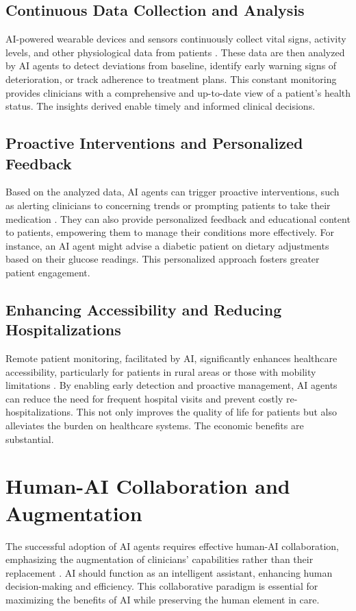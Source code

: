 \documentclass[12pt,a4paper]{article}
\begin{document}
\subsection{Continuous Data Collection and Analysis}
AI-powered wearable devices and sensors continuously collect vital signs, activity levels, and other physiological data from patients \cite{oracle}. These data are then analyzed by AI agents to detect deviations from baseline, identify early warning signs of deterioration, or track adherence to treatment plans. This constant monitoring provides clinicians with a comprehensive and up-to-date view of a patient's health status. The insights derived enable timely and informed clinical decisions.

\subsection{Proactive Interventions and Personalized Feedback}
Based on the analyzed data, AI agents can trigger proactive interventions, such as alerting clinicians to concerning trends or prompting patients to take their medication \cite{nih_patient_outcomes}. They can also provide personalized feedback and educational content to patients, empowering them to manage their conditions more effectively. For instance, an AI agent might advise a diabetic patient on dietary adjustments based on their glucose readings. This personalized approach fosters greater patient engagement.

\subsection{Enhancing Accessibility and Reducing Hospitalizations}
Remote patient monitoring, facilitated by AI, significantly enhances healthcare accessibility, particularly for patients in rural areas or those with mobility limitations \cite{televox_patient_engagement}. By enabling early detection and proactive management, AI agents can reduce the need for frequent hospital visits and prevent costly re-hospitalizations. This not only improves the quality of life for patients but also alleviates the burden on healthcare systems. The economic benefits are substantial.

\section{Human-AI Collaboration and Augmentation}
The successful adoption of AI agents requires effective human-AI collaboration, emphasizing the augmentation of clinicians' capabilities rather than their replacement \cite{nih_ethical_implications}. AI should function as an intelligent assistant, enhancing human decision-making and efficiency. This collaborative paradigm is essential for maximizing the benefits of AI while preserving the human element in care.
\end{document}
